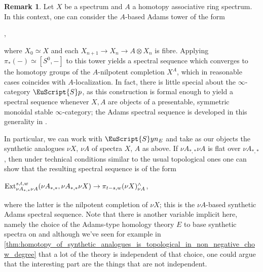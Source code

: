 \documentclass[oneside,a4paper]{amsart}
\newcommand{\euscr}[1]{\EuScript{#1}} %
\newcommand{\Ext}{\textnormal{Ext}} %
\newcommand{\spectra}{\euscr{S}p} %
\newcommand{\synspectra}{\euscr{S}yn} %
\theoremstyle{plain}
\theoremstyle{definition}
\newtheorem{rem}[thm]{Remark}
\theoremstyle{remark}
\begin{document}
\begin{rem}
\label{rem:ctau_philosophy}
Let $X$ be a spectrum and $A$ a homotopy associative ring spectrum. In this context, one can consider the $A$-based Adams tower of the form 

\begin{center}
	,
\end{center}
where $X_{0} \simeq X$ and each $X_{n+1} \rightarrow X_{n} \rightarrow A \otimes X_{n}$ is fibre. Applying $\pi_{*}(-) \simeq [S^{0}, -]$ to this tower yields a spectral sequence which converges to the homotopy groups of the $A$-nilpotent completion $X^{A}$, which in reasonable cases coincides with $A$-localization. In fact, there is little special about the $\infty$-category $\spectra$, as this construction is formal enough to yield a spectral sequence whenever $X, A$ are objects of a presentable, symmetric monoidal stable $\infty$-category; the Adams spectral sequence is developed in this generality in \cite{mathew2017nilpotence}.

In particular, we can work with $\synspectra_{E}$ and take as our objects the synthetic analogues $\nu X$, $\nu A$ of spectra $X$, $A$ as above. If $\nu A_{*, *} \nu A$ is flat over $\nu A_{*, *}$, then under technical conditions similar to the usual topological ones one can show that the resulting spectral sequence is of the form 

\begin{center}
$\Ext^{s,t,w}_{\nu A_{*, *} \nu A}(\nu A_{*, *}, \nu A_{*, *} \nu X) \rightarrow \pi_{t-s, w} (\nu X)^{\wedge}_{\nu A}$,
\end{center}
where the latter is the nilpotent completion of $\nu X$; this is the $\nu A$-based synthetic Adams spectral sequence. Note that there is another variable implicit here, namely the choice of the Adams-type homology theory $E$ to base synthetic spectra on and although we've seen for example in \cref{thm:homotopy_of_synthetic_analogues_is_topological_in_non_negative_chow_degree} that a lot of the theory is independent of that choice, one could argue that the interesting part are the things that are not independent. 


\end{rem}
\end{document}
